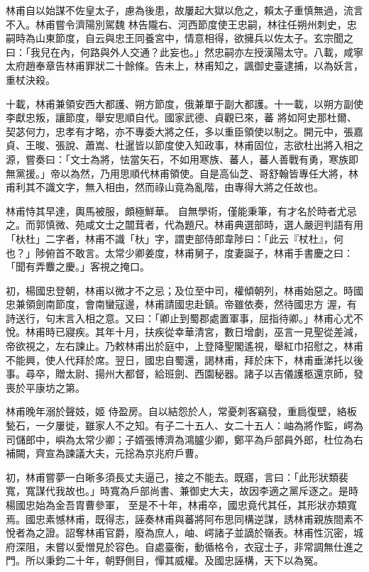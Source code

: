 \begin{pinyinscope}
 林甫自以始謀不佐皇太子，慮為後患，故屢起大獄以危之，賴太子重慎無過，流言不入。林甫嘗令濟陽別駕魏
 林告隴右、河西節度使王忠嗣，林往任朔州刺史，忠嗣時為山東節度，自云與忠王同養宮中，情意相得，欲擁兵以佐太子。玄宗聞之曰：「我兒在內，何路與外人交通？此妄也。」然忠嗣亦左授漢陽太守。八載，咸寧太府趙奉章告林甫罪狀二十餘條。告未上，林甫知之，諷御史臺逮捕，以為妖言，重杖決殺。



 十載，林甫兼領安西大都護、朔方節度，俄兼單于副大都護。十一載，以朔方副使李獻忠叛，讓節度，舉安思順自代。國家武德、貞觀已來，蕃
 將如阿史那杜爾、契苾何力，忠孝有才略，亦不專委大將之任，多以重臣領使以制之。開元中，張嘉貞、王晙、張說、蕭嵩、杜暹皆以節度使入知政事，林甫固位，志欲杜出將入相之源，嘗奏曰：「文士為將，怯當矢石，不如用寒族、蕃人，蕃人善戰有勇，寒族即無黨援。」帝以為然，乃用思順代林甫領使。自是高仙芝、哥舒翰皆專任大將，林甫利其不識文字，無入相由，然而祿山竟為亂階，由專得大將之任故也。



 林甫恃其早達，輿馬被服，頗極鮮華。
 自無學術，僅能秉筆，有才名於時者尤忌之。而郭慎微、苑咸文士之闒茸者，代為題尺。林甫典選部時，選人嚴迥判語有用「杕杜」二字者，林甫不識「杕」字，謂吏部侍郎韋陟曰：「此云『杖杜』，何也？」陟俯首不敢言。太常少卿姜度，林甫舅子，度妻誕子，林甫手書慶之曰：「聞有弄麞之慶。」客視之掩口。



 初，楊國忠登朝，林甫以微才不之忌；及位至中司，權傾朝列，林甫始惡之。時國忠兼領劍南節度，會南蠻寇邊，林甫請國忠赴鎮。帝雖依奏，然待國忠方
 渥，有詩送行，句末言入相之意。又曰：「卿止到蜀郡處置軍事，屈指待卿。」林甫心尤不悅。林甫時已寢疾。其年十月，扶疾從幸華清宮，數日增劇，巫言一見聖從差減，帝欲視之，左右諫止。乃敕林甫出於庭中，上登降聖閣遙視，舉紅巾招慰之，林甫不能興，使人代拜於席。翌日，國忠自蜀還，謁林甫，拜於床下，林甫垂涕托以後事。尋卒，贈太尉、揚州大都督，給班劍、西園秘器。諸子以吉儀護柩還京師，發喪於平康坊之第。



 林甫晚年溺於聲妓，姬
 侍盈房。自以結怨於人，常憂刺客竊發，重扃復壁，絡板甃石，一夕屢徙，雖家人不之知。有子二十五人、女二十五人：岫為將作監，崿為司儲郎中，嶼為太常少卿；子婿張博濟為鴻臚少卿，鄭平為戶部員外郎，杜位為右補闕，齊宣為諫議大夫，元捴為京兆府戶曹。



 初，林甫嘗夢一白晰多須長丈夫逼己，接之不能去。既寤，言曰：「此形狀類裴寬，寬謀代我故也。」時寬為戶部尚書、兼御史大夫，故因李適之黨斥逐之。是時楊國忠始為金吾胄曹參軍，
 至是不十年，林甫卒，國忠竟代其任，其形狀亦類寬焉。國忠素憾林甫，既得志，誣奏林甫與蕃將阿布思同構逆謀，誘林甫親族間素不悅者為之證。詔奪林甫官爵，廢為庶人，岫、崿諸子並謫於嶺表。林甫性沉密，城府深阻，未嘗以愛憎見於容色。自處臺衡，動循格令，衣寇士子，非常調無仕進之門。所以秉鈞二十年，朝野側目，憚其威權。及國忠誣構，天下以為冤。




\end{pinyinscope}
